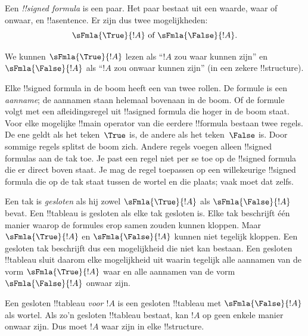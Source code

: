 \documentclass[openany]{memoir}
\begin{document}
\begin{defn}
  Een \emph{!!{signed formula}} is een paar. Het paar bestaat uit een
  waarde, waar of onwaar, en !!a{sentence}. Er zijn dus twee
  mogelijkheden:
  \[
  \sFmla{\True}{!A} \text{ of } \sFmla{\False}{!A}.
  \]
\end{defn}

We kunnen $\sFmla{\True}{!A}$ lezen als ``$!A$ zou waar kunnen zijn''
en $\sFmla{\False}{!A}$ als ``$!A$ zou onwaar kunnen zijn'' (in een
zekere !!{structure}).

Elke !!{signed formula} in de boom heeft een van twee rollen. De
formule is een \emph{aanname}; de aannamen staan helemaal bovenaan in
de boom. Of de formule volgt met een afleidingsregel uit !!a{signed
formula} die hoger in de boom staat. Voor elke mogelijke
!!{main operator} van die eerdere
!!{formula} bestaan twee regels. De ene geldt als het teken~$\True$
is, de andere als het teken~$\False$ is. Door sommige regels splitst
de boom zich. Andere regels voegen alleen !!{signed formula}s aan de
tak toe. Je past een regel niet per se toe op de !!{signed formula}
die er direct boven staat. Je mag de regel toepassen op een
willekeurige !!{signed formula} die op de tak staat tussen de wortel
en die plaats; vaak moet dat zelfs.

Een tak is \emph{gesloten} als hij zowel $\sFmla{\True}{!A}$ als
$\sFmla{\False}{!A}$ bevat. Een !!{tableau} is gesloten als elke tak
gesloten is. Elke tak beschrijft één manier waarop de formules erop
samen zouden kunnen kloppen. Maar $\sFmla{\True}{!A}$ en
$\sFmla{\False}{!A}$ kunnen niet tegelijk kloppen. Een gesloten tak
beschrijft dus een mogelijkheid die niet kan bestaan. Een gesloten
!!{tableau} sluit daarom elke mogelijkheid uit
waarin tegelijk alle aannamen van de vorm $\sFmla{\True}{!A}$ waar en
alle aannamen van de vorm~$\sFmla{\False}{!A}$ onwaar zijn.

Een gesloten !!{tableau} \emph{voor $!A$} is een gesloten
!!{tableau} met $\sFmla{\False}{!A}$ als wortel. Als zo'n gesloten
!!{tableau} bestaat, kan $!A$ op geen enkele manier onwaar zijn. Dus
moet $!A$ waar zijn in elke !!{structure}.
\endgroup

\begingroup
\def\olfilename{OLP-0100}
\def\olfilepath{content/first-order-logic/tableaux/}
\hypertarget{unit-OLP-0100}{}
\end{document}
